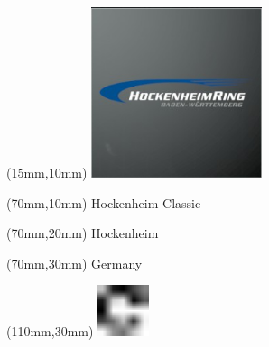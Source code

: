\null\newpage
\begin{textblock*}{50mm}(15mm,10mm)%
\includegraphics[width=50mm]{LG/2015-05-20_00082.png}
\end{textblock*}
\begin{textblock*}{130mm}(70mm,10mm)%
{\fontsize{20}{20}\selectfont Hockenheim Classic}\\
\end{textblock*}
\begin{textblock*}{120mm}(70mm,20mm)%
{\fontsize{16}{16}\selectfont Hockenheim}\\
\end{textblock*}
\begin{textblock*}{120mm}(70mm,30mm)%
{\fontsize{12}{12}\selectfont Germany}
\end{textblock*}
\begin{textblock*}{30mm}(110mm,30mm)%
\centering
\includegraphics[height=15mm]{icons/fa-rotate-right.pdf}
\end{textblock*}
